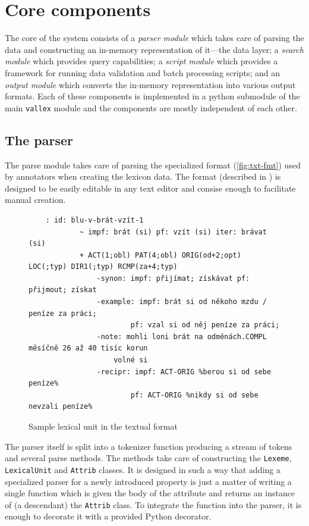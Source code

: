 \documentclass[10pt, a4paper, twocolumn]{article} %
\newcommand{\py}[1]{{\tt #1}}
\begin{document}
\section{Core components}
The core of the system consists of a \emph{parser module} which takes care of parsing the data and
constructing an in-memory representation of it---the data layer; a \emph{search module} which
provides query capabilities; a \emph{script module} which provides a framework for running data validation
and batch processing scripts; and an \emph{output module} which converts the in-memory representation into
various output formats. Each of these components is implemented in a python submodule of the main \py{vallex}
module and the components are mostly independent of each other.

\subsection{The parser}
The parse module takes care of parsing the specialized format (\autoref{fig:txt-fmt}) used by annotators when creating the lexicon data. The format (described in \cite{vallex}) is designed to be easily editable in any text editor and consise enough to facilitate manual creation.

\begin{figure}
\tiny
\begin{verbatim}
    : id: blu-v-brát-vzít-1
            ~ impf: brát (si) pf: vzít (si) iter: brávat (si)
            + ACT(1;obl) PAT(4;obl) ORIG(od+2;opt) LOC(;typ) DIR1(;typ) RCMP(za+4;typ)
                -synon: impf: přijímat; získávat pf: přijmout; získat
                -example: impf: brát si od někoho mzdu / peníze za práci;
                        pf: vzal si od něj peníze za práci;
                -note: mohli loni brát na odměnách.COMPL měsíčně 26 až 40 tisíc korun
                    volné si
                -recipr: impf: ACT-ORIG %berou si od sebe peníze%
                        pf: ACT-ORIG %nikdy si od sebe nevzali peníze%
\end{verbatim}
\caption{\label{fig:txt-fmt}Sample lexical unit in the textual format}
\end{figure}

The parser itself is split into a tokenizer function producing a stream of tokens and several
parse methods. The methods take care of constructing the \py{Lexeme}, \py{LexicalUnit}
and \py{Attrib} classes. It is designed in such a way that adding a specialized parser for
a newly introduced property is just a matter of writing a single function which is given
the body of the attribute and returns an instance of (a descendant) the \py{Attrib} class.
To integrate the function into the parser, it is enough to decorate it with a provided
Python decorator.
\end{document}
